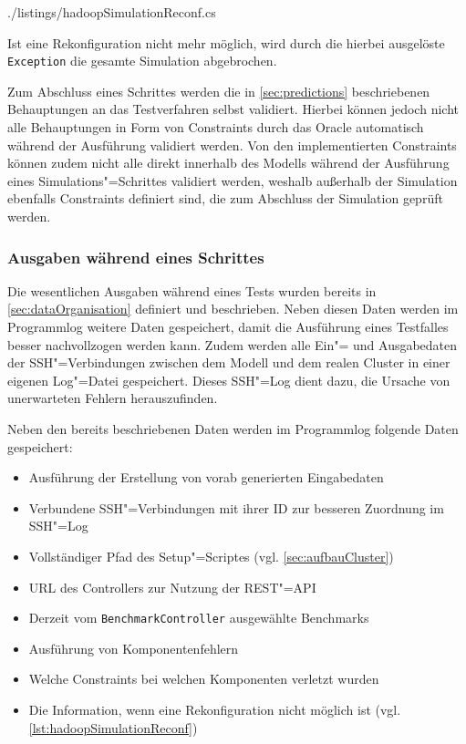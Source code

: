 
{./listings/hadoopSimulationReconf.cs}

Ist eine Rekonfiguration nicht mehr möglich, wird durch die hierbei ausgelöste \texttt{Exception} die gesamte Simulation abgebrochen.

Zum Abschluss eines Schrittes werden die in \autoref{sec:predictions} beschriebenen Behauptungen an das Testverfahren selbst validiert.
Hierbei können jedoch nicht alle Behauptungen in Form von Constraints durch das Oracle automatisch während der Ausführung validiert werden.
Von den implementierten Constraints können zudem nicht alle direkt innerhalb des Modells während der Ausführung eines Simulations"=Schrittes validiert werden, weshalb außerhalb der Simulation ebenfalls Constraints definiert sind, die zum Abschluss der Simulation geprüft werden.

\subsubsection{Ausgaben während eines Schrittes}
\label{sec:simulationStepOutput}

Die wesentlichen Ausgaben während eines Tests wurden bereits in \autoref{sec:dataOrganisation} definiert und beschrieben.
Neben diesen Daten werden im Programmlog weitere Daten gespeichert, damit die Ausführung eines Testfalles besser nachvollzogen werden kann.
Zudem werden alle Ein"= und Ausgabedaten der SSH"=Verbindungen zwischen dem Modell und dem realen Cluster in einer eigenen Log"=Datei gespeichert.
Dieses SSH"=Log dient dazu, die Ursache von unerwarteten Fehlern herauszufinden.

Neben den bereits beschriebenen Daten werden im Programmlog folgende Daten gespeichert:

\begin{itemize}
    \item Ausführung der Erstellung von vorab generierten Eingabedaten
    \item Verbundene SSH"=Verbindungen mit ihrer ID zur besseren Zuordnung im SSH"=Log
    \item Vollständiger Pfad des Setup"=Scriptes (vgl. \autoref{sec:aufbauCluster})
    \item URL des Controllers zur Nutzung der REST"=API
    \item Derzeit vom \texttt{BenchmarkController} ausgewählte Benchmarks
    \item Ausführung von Komponentenfehlern
    \item Welche Constraints bei welchen Komponenten verletzt wurden
    \item Die Information, wenn eine Rekonfiguration nicht möglich ist (vgl. \autoref{lst:hadoopSimulationReconf})
\end{itemize}

